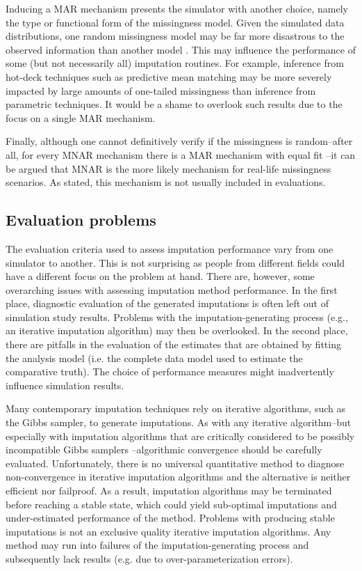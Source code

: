 \documentclass[bimj,fleqn]{w-art}
\begin{document}
Inducing a MAR mechanism presents the simulator with another choice, namely the type or functional form of the missingness model. Given the simulated data distributions, one random missingness model may be far more disastrous to the observed information than another model \citep{scho18}. This may influence the performance of some (but not necessarily all) imputation routines. For example, inference from hot-deck techniques such as predictive mean matching \citep{little1988missing, rubin1986statistical} may be more severely impacted by large amounts of one-tailed missingness than inference from parametric techniques. It would be a shame to overlook such results due to the focus on a single MAR mechanism.

Finally, although one cannot definitively verify if the missingness is random--after all, for every MNAR mechanism there is a MAR mechanism with equal fit \citep{molenberghs2008every}--it can be argued that MNAR is the more likely mechanism for real-life missingness scenarios. As stated, this mechanism is not usually included in evaluations. 



\subsection{Evaluation problems}

The evaluation criteria used to assess imputation performance vary from one simulator to another. This is not surprising as people from different fields could have a different focus on the problem at hand. There are, however, some overarching issues with assessing imputation method performance. In the first place, diagnostic evaluation of the generated imputations is often left out of simulation study results. Problems with the imputation-generating process (e.g., an iterative imputation algorithm) may then be overlooked. In the second place, there are pitfalls in the evaluation of the estimates that are obtained by fitting the analysis model (i.e. the complete data model used to estimate the comparative truth). The choice of performance measures might inadvertently influence simulation results.

Many contemporary imputation techniques rely on iterative algorithms, such as the Gibbs sampler, to generate imputations. As with any iterative algorithm--but especially with imputation algorithms that are critically considered to be possibly incompatible Gibbs samplers \citep[PIGS,][]{li2012imputing}--algorithmic convergence should be carefully evaluated. Unfortunately, there is no universal quantitative method to diagnose non-convergence in iterative imputation algorithms \citep{zhu15, ober21} and the alternative \citep[visual inspection of the imputation algorithm;][]{buur18} is neither efficient nor failproof. As a result, imputation algorithms may be terminated before reaching a stable state, which could yield sub-optimal imputations and under-estimated performance of the method. Problems with producing stable imputations is not an exclusive quality iterative imputation algorithms. Any method may run into failures of the imputation-generating process and subsequently lack results (e.g. due to over-parameterization errors).
\end{document}
